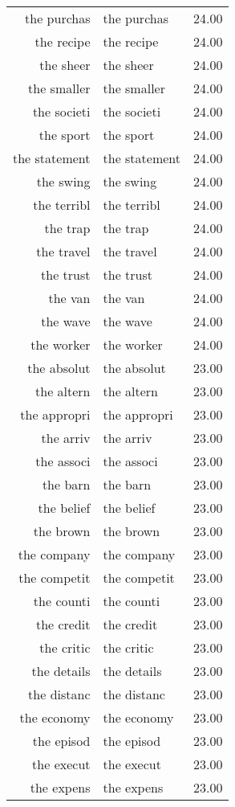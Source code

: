 \begin{table}[ht]
\begin{tabular}{rlr}
  the purchas & the purchas & 24.00 \\ 
  the recipe & the recipe & 24.00 \\ 
  the sheer & the sheer & 24.00 \\ 
  the smaller & the smaller & 24.00 \\ 
  the societi & the societi & 24.00 \\ 
  the sport & the sport & 24.00 \\ 
  the statement & the statement & 24.00 \\ 
  the swing & the swing & 24.00 \\ 
  the terribl & the terribl & 24.00 \\ 
  the trap & the trap & 24.00 \\ 
  the travel & the travel & 24.00 \\ 
  the trust & the trust & 24.00 \\ 
  the van & the van & 24.00 \\ 
  the wave & the wave & 24.00 \\ 
  the worker & the worker & 24.00 \\ 
  the absolut & the absolut & 23.00 \\ 
  the altern & the altern & 23.00 \\ 
  the appropri & the appropri & 23.00 \\ 
  the arriv & the arriv & 23.00 \\ 
  the associ & the associ & 23.00 \\ 
  the barn & the barn & 23.00 \\ 
  the belief & the belief & 23.00 \\ 
  the brown & the brown & 23.00 \\ 
  the company & the company & 23.00 \\ 
  the competit & the competit & 23.00 \\ 
  the counti & the counti & 23.00 \\ 
  the credit & the credit & 23.00 \\ 
  the critic & the critic & 23.00 \\ 
  the details & the details & 23.00 \\ 
  the distanc & the distanc & 23.00 \\ 
  the economy & the economy & 23.00 \\ 
  the episod & the episod & 23.00 \\ 
  the execut & the execut & 23.00 \\ 
  the expens & the expens & 23.00 \\ 

\end{tabular}
\end{table}
